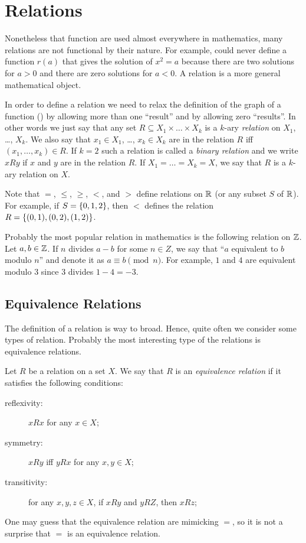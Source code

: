 \chapter{Relations}
Nonetheless that function are used almost everywhere in mathematics, many
relations are not functional by their nature. For example, could never define a
function $r(a)$ that gives the solution of $x^2 = a$ because there are two
solutions for $a > 0$ and there are zero solutions for $a < 0$. A relation is a
more general mathematical object.

In order to define a relation we need to relax the definition of the graph of a
function () by allowing more than one ``result'' and
by allowing zero ``results''. In other words we just say that any set $R
\subseteq X_1 \times \dots \times X_k$ is a $k$-ary \textit{relation} on $X_1$,
\dots, $X_k$. We also say that $x_1 \in X_1$, \dots, $x_k \in X_k$ are in the
relation $R$ iff $(x_1, \dots, x_k) \in R$. If $k = 2$ such a relation is
called a \textit{binary relation} and we write $x R y$ if $x$ and $y$ are in
the relation $R$. If $X_1 = \dots = X_k = X$, we say that $R$ is a $k$-ary
relation on $X$.

Note that $=$, $\le$, $\ge$, $<$, and $>$ define relations on $\mathbb{R}$ (or any
subset $S$ of $\mathbb{R}$). For example, if $S = \set{0, 1, 2}$, then $<$ defines
the relation $R = \set{(0, 1), (0, 2), (1, 2)}$.

Probably the most popular relation in mathematics is the following relation on
$\mathbb{Z}$. Let $a, b \in \mathbb{Z}$. If $n$ divides $a - b$ for some $n \in Z$, we say that
``$a$ equivalent to $b$ modulo $n$'' and denote it as $a \equiv b \pmod{n}$.
For example, $1$ and $4$ are equivalent modulo $3$ since $3$ divides
$1 - 4 = -3$.

\section{Equivalence Relations}
The definition of a relation is way to broad. Hence, quite often we consider
some types of relation. Probably the most interesting type of the relations is
equivalence relations.

\begin{definition}
  Let $R$ be a relation on a set $X$. We say that $R$ is an \textit{equivalence
  relation} if it satisfies the following conditions:
  \begin{description}
    \item[reflexivity:]  $x R x$ for any $x \in X$;
    \item[symmetry:]  $x R y$ iff $y R x$ for any $x, y \in X$;
    \item[transitivity:]  for any $x, y, z \in X$, if $x R y$ and $y R Z$, then
      $x R z$;
  \end{description}
\end{definition}
One may guess that the equivalence relation are mimicking $=$, so it is not a
surprise that $=$ is an equivalence relation.

